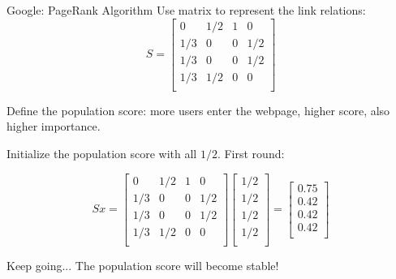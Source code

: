 \documentclass{beamer}
\begin{document}
\begin{frame}{Google: PageRank Algorithm}
Use matrix to represent the link relations:
\begin{equation*}
    S=\left[ \begin{matrix}
        0&		1/2&		1&		0\\
        1/3&		0&		0&		1/2\\
        1/3&		0&		0&		1/2\\
        1/3&		1/2&		0&		0\\
    \end{matrix} \right]
\end{equation*}

Define the population score: more users enter the webpage, higher score, also higher importance.

\vspace{3pt}
Initialize the population score with all $1/2$. First round:

\begin{equation*}
    Sx=\left[ \begin{matrix}
        0&		1/2&		1&		0\\
        1/3&		0&		0&		1/2\\
        1/3&		0&		0&		1/2\\
        1/3&		1/2&		0&		0\\
    \end{matrix} \right] \left[ \begin{array}{c}
        1/2\\
        1/2\\
        1/2\\
        1/2\\
    \end{array} \right] =\left[ \begin{array}{c}
        0.75\\
        0.42\\
        0.42\\
        0.42\\
    \end{array} \right]
\end{equation*}

Keep going... The population score will become stable!

\end{frame}
\end{document}

